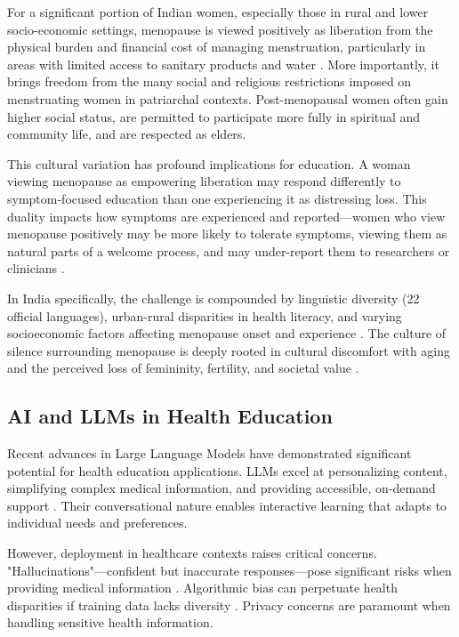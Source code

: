 \documentclass[letterpaper]{article} %
\begin{document}
For a significant portion of Indian women, especially those in rural and lower socio-economic settings, menopause is viewed positively as liberation from the physical burden and financial cost of managing menstruation, particularly in areas with limited access to sanitary products and water \cite{bmjgh2023menopause}. More importantly, it brings freedom from the many social and religious restrictions imposed on menstruating women in patriarchal contexts. Post-menopausal women often gain higher social status, are permitted to participate more fully in spiritual and community life, and are respected as elders.

This cultural variation has profound implications for education. A woman viewing menopause as empowering liberation may respond differently to symptom-focused education than one experiencing it as distressing loss. This duality impacts how symptoms are experienced and reported—women who view menopause positively may be more likely to tolerate symptoms, viewing them as natural parts of a welcome process, and may under-report them to researchers or clinicians \cite{bmjgh2023menopause}.

In India specifically, the challenge is compounded by linguistic diversity (22 official languages), urban-rural disparities in health literacy, and varying socioeconomic factors affecting menopause onset and experience \cite{femtechinsider2023india}. The culture of silence surrounding menopause is deeply rooted in cultural discomfort with aging and the perceived loss of femininity, fertility, and societal value \cite{etvbharat2024taboo}.

\subsection{AI and LLMs in Health Education}

Recent advances in Large Language Models have demonstrated significant potential for health education applications. LLMs excel at personalizing content, simplifying complex medical information, and providing accessible, on-demand support \cite{pmc2024llm}. Their conversational nature enables interactive learning that adapts to individual needs and preferences.

However, deployment in healthcare contexts raises critical concerns. "Hallucinations"—confident but inaccurate responses—pose significant risks when providing medical information \cite{mountsinai2025misinformation}. Algorithmic bias can perpetuate health disparities if training data lacks diversity \cite{cdc2024bias}. Privacy concerns are paramount when handling sensitive health information.
\end{document}
